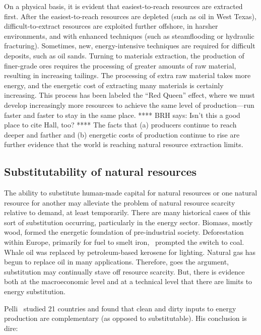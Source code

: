 On a physical basis, 
it is evident that easiest-to-reach resources are extracted first. 
After the easiest-to-reach resources are depleted (such as oil in West Texas),
difficult-to-extract resources are exploited
further offshore,
in harsher environments, and
with enhanced techniques (such as steamflooding or hydraulic fracturing).
Sometimes, new, energy-intensive techniques are required 
for difficult deposits, such as oil sands.
Turning to materials extraction, the production of finer-grade ores
requires the processing of greater amounts of raw material, 
resulting in increasing tailings.
The processing of extra raw material takes more energy, and 
the energetic cost of extracting many materials is certainly increasing.\cite{Hall1986, Mudd2010,Hall2011}
This process has been labeled the ``Red Queen'' effect, 
where we must develop increasingly more resources to achieve the same
level of production---run faster and faster to stay in 
the same place.\cite{Lees1975, Ross1988, Murray2013, Murphy2014}
**** BRH says: Isn't this a good place to cite Hall, too? ****
The facts that (a) producers continue to reach deeper and farther 
and (b) energetic costs of production continue to rise
are further evidence that the world is reaching natural resource extraction limits.


\subsection{Substitutability of natural resources}

The ability to substitute human-made capital for natural resources
or one natural resource for another 
may alleviate the problem of natural resource scarcity relative to demand,
at least temporarily.
There are many historical cases of this sort of substitution occurring,
particularly in the energy sector.
Biomass, mostly wood,
formed the energetic foundation of pre-industrial society.
Deforestation within Europe,
primarily for fuel to smelt iron,~\cite{Smil1994}
prompted the switch to coal.
Whale oil was replaced by petroleum-based kerosene for lighting.\cite{Weissenbacher2009}
Natural gas has begun to replace oil in many applications.
Therefore, goes the argument, 
substitution may continually stave off resource scarcity.
But, there is evidence both at the macroeconomic level and 
at a technical level that there are limits to energy substitution.

Pelli~\cite{Pelli:2012wv} studied 21 countries 
and found that clean and dirty inputs to energy production
are complementary (as opposed to substitutable).
His conclusion is dire:

